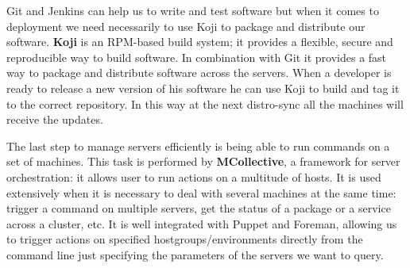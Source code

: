 Git and Jenkins can help us to write and test software but when it comes
to deployment we need necessarily to use Koji to package and distribute
our software. \textbf{Koji} is an RPM-based build system; it provides
a flexible, secure and reproducible way to build software. In combination
with Git it provides a fast way to package and distribute software across
the servers. When a developer is ready to release a new version of his
software he can use Koji to build and tag it to the correct repository. In
this way at the next distro-sync all the machines will receive the
updates.

The last step to manage servers efficiently is being able to run commands
on a set of machines. This task is performed by \textbf{MCollective},
a framework for server orchestration: it allows user to run actions on
a multitude of hosts. It is used extensively when it is necessary to deal
with several machines at the same time: trigger a command on multiple
servers, get the status of a package or a service across a cluster, etc.
It is well integrated with Puppet and Foreman, allowing us to trigger
actions on specified hostgroups/environments directly from the command
line just specifying the parameters of the servers we want to query.

